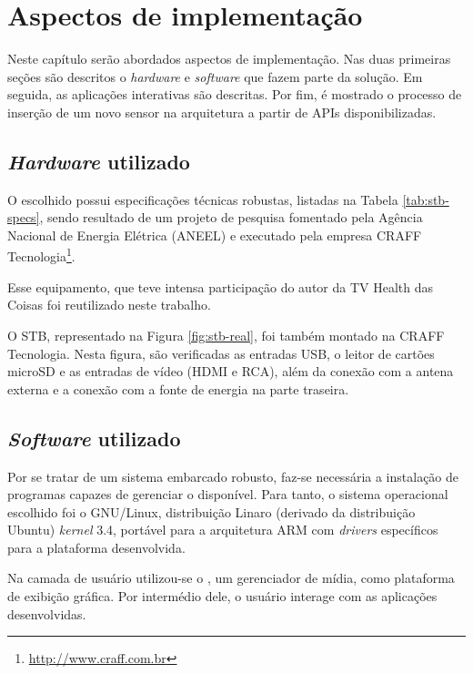 \chapter{Aspectos de implementação} \label{cap:aspectos-de-implementacao}

Neste capítulo serão abordados aspectos de implementação. Nas duas primeiras
seções são descritos o \textit{hardware} e \textit{software} que fazem parte da
solução. Em seguida, as aplicações interativas são descritas. Por fim, é mostrado
o processo de inserção de um novo sensor na arquitetura a partir de APIs 
disponibilizadas.

\section{\textit{Hardware} utilizado} 

O \stb[] escolhido possui especificações técnicas robustas, listadas na 
Tabela \ref{tab:stb-specs}, sendo resultado de um projeto de pesquisa
fomentado pela Agência Nacional de Energia Elétrica (ANEEL) e executado pela
empresa CRAFF Tecnologia\footnote{\url{http://www.craff.com.br}}. 

Esse equipamento, que teve intensa participação do autor da TV Health das
Coisas foi reutilizado neste trabalho.


O STB, representado na Figura \vref{fig:stb-real}, foi também montado na CRAFF
Tecnologia. Nesta figura, são verificadas as entradas USB, o leitor de cartões
microSD e as entradas de vídeo (HDMI e RCA), além da conexão com a antena
externa e a conexão com a fonte de energia na parte traseira.

\section{\textit{Software} utilizado}

Por se tratar de um sistema embarcado robusto, faz-se necessária a instalação
de programas capazes de gerenciar o \hardware[] disponível. Para tanto, o
sistema operacional escolhido foi o GNU/Linux, distribuição Linaro (derivado da
distribuição Ubuntu) \textit{kernel} 3.4, portável para a arquitetura ARM com
\textit{drivers} específicos para a plataforma desenvolvida.


Na camada de usuário utilizou-se o \software[] \xbmc[], um gerenciador de mídia,
como plataforma de exibição gráfica. Por intermédio dele, o usuário
interage com as aplicações desenvolvidas.  

